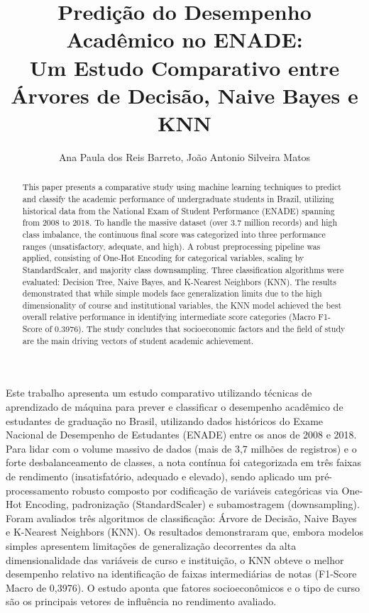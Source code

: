 \documentclass[12pt]{article}
\title{Predição do Desempenho Acadêmico no ENADE: \\ Um Estudo Comparativo entre Árvores de Decisão, Naive Bayes e KNN}
\author{Ana Paula dos Reis Barreto, João Antonio Silveira Matos}
\begin{document}
 

\maketitle

\begin{abstract}
This paper presents a comparative study using machine learning techniques to predict and classify the academic performance of undergraduate students in Brazil, utilizing historical data from the National Exam of Student Performance (ENADE) spanning from 2008 to 2018. To handle the massive dataset (over 3.7 million records) and high class imbalance, the continuous final score was categorized into three performance ranges (unsatisfactory, adequate, and high). A robust preprocessing pipeline was applied, consisting of One-Hot Encoding for categorical variables, scaling by StandardScaler, and majority class downsampling. Three classification algorithms were evaluated: Decision Tree, Naive Bayes, and K-Nearest Neighbors (KNN). The results demonstrated that while simple models face generalization limits due to the high dimensionality of course and institutional variables, the KNN model achieved the best overall relative performance in identifying intermediate score categories (Macro F1-Score of 0.3976). The study concludes that socioeconomic factors and the field of study are the main driving vectors of student academic achievement.

\end{abstract}
     
\begin{resumo} 
Este trabalho apresenta um estudo comparativo utilizando técnicas de aprendizado de máquina para prever e classificar o desempenho acadêmico de estudantes de graduação no Brasil, utilizando dados históricos do Exame Nacional de Desempenho de Estudantes (ENADE) entre os anos de 2008 e 2018. Para lidar com o volume massivo de dados (mais de 3,7 milhões de registros) e o forte desbalanceamento de classes, a nota contínua foi categorizada em três faixas de rendimento (insatisfatório, adequado e elevado), sendo aplicado um pré-processamento robusto composto por codificação de variáveis categóricas via One-Hot Encoding, padronização (StandardScaler) e subamostragem (downsampling). Foram avaliados três algoritmos de classificação: Árvore de Decisão, Naive Bayes e K-Nearest Neighbors (KNN). Os resultados demonstraram que, embora modelos simples apresentem limitações de generalização decorrentes da alta dimensionalidade das variáveis de curso e instituição, o KNN obteve o melhor desempenho relativo na identificação de faixas intermediárias de notas (F1-Score Macro de 0,3976). O estudo aponta que fatores socioeconômicos e o tipo de curso são os principais vetores de influência no rendimento avaliado.
\end{resumo}
\end{document}
